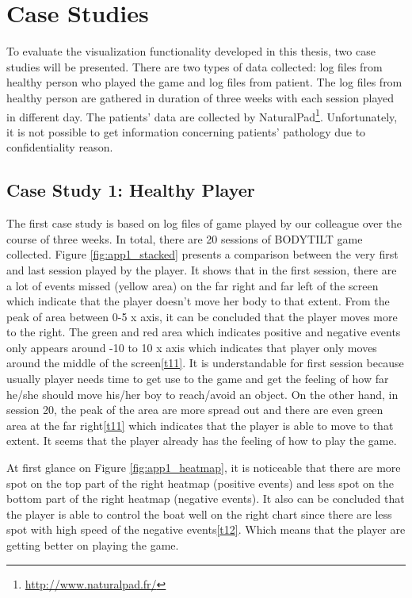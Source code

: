 \chapter{Case Studies}
To evaluate the visualization functionality developed in this thesis, two case studies will be presented. There are two types of data collected: log files from healthy person who played the game and log files from patient. The log files from healthy person are gathered in duration of three weeks with each session played in different day. The patients' data are collected by NaturalPad\footnote{\url{http://www.naturalpad.fr/}}. Unfortunately, it is not possible to get information concerning patients' pathology due to confidentiality reason. 

\section{Case Study 1: Healthy Player}
The first case study is based on log files of game played by our colleague over the course of three weeks. In total, there are 20 sessions of BODYTILT game collected. Figure \ref{fig:app1_stacked} presents a comparison between the very first and last session played by the player. It shows that in the first session, there are a lot of events missed (yellow area) on the far right and far left of the screen which indicate that the player doesn't move her body to that extent. From the peak of area between 0-5 x axis, it can be concluded that the player moves more to the right. The green and red area which indicates positive and negative events only appears around -10 to 10 x axis which indicates that player only moves around the middle of the screen\ref{t11}. It is understandable for first session because usually player needs time to get use to the game and get the feeling of how far he/she should move his/her boy to reach/avoid an object. On the other hand, in session 20, the peak of the area are more spread out and there are even green area at the far right\ref{t11} which indicates that the player is able to move to that extent. It seems that the player already has the feeling of how to play the game.

At first glance on Figure \ref{fig:app1_heatmap}, it is noticeable that there are more spot on the top part of the right heatmap (positive events) and less spot on the bottom part of the right heatmap (negative events). It also can be concluded that the player is able to control the boat well on the right chart since there are less spot with high speed of the negative events\ref{t12}. Which means that the player are getting better on playing the game. 

